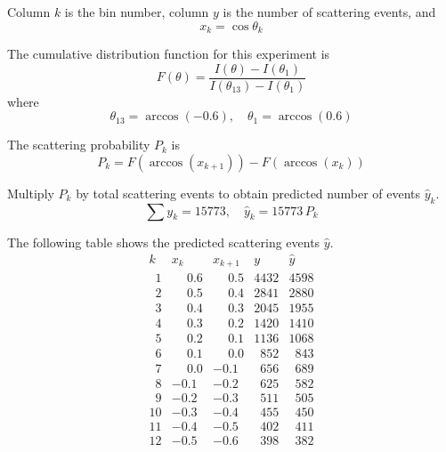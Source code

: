Column $k$ is the bin number, column $y$ is the number of scattering events, and
\begin{equation*}
x_k=\cos\theta_k
\end{equation*}

The cumulative distribution function for this experiment is
\begin{equation*}
F(\theta)=\frac{I(\theta)-I(\theta_1)}
{I(\theta_{13})-I(\theta_1)}
\end{equation*}
where
\begin{equation*}
\theta_{13}=\arccos(-0.6),
\quad
\theta_1=\arccos(0.6)
\end{equation*}

The scattering probability $P_k$ is
\begin{equation*}
P_k=F\left(\arccos(x_{k+1})\right)-F\left(\arccos(x_k)\right)
\end{equation*}

Multiply $P_k$ by total scattering events to obtain predicted number of events $\hat{y}_k$.
\begin{equation*}
\sum y_k=15773,\quad \hat{y}_k=15773\,P_k
\end{equation*}

The following table shows the predicted scattering events $\hat y$.
\begin{equation*}
\begin{matrix}
k & x_k & x_{k+1} & y & \hat y\\
\phantom01 & \phantom+0.6 & \phantom+0.5 & 4432 & 4598\\
\phantom02 & \phantom+0.5 & \phantom+0.4 & 2841 & 2880\\
\phantom03 & \phantom+0.4 & \phantom+0.3 & 2045 & 1955\\
\phantom04 & \phantom+0.3 & \phantom+0.2 & 1420 & 1410\\
\phantom05 & \phantom+0.2 & \phantom+0.1 & 1136 & 1068\\
\phantom06 & \phantom+0.1 & \phantom+0.0 & \phantom0852 & \phantom0843\\
\phantom07 & \phantom+0.0 & -0.1 & \phantom0656 & \phantom0689\\
\phantom08 & -0.1 & -0.2 & \phantom0625 & \phantom0582\\
\phantom09 & -0.2 & -0.3 & \phantom0511 & \phantom0505\\
10 & -0.3 & -0.4 & \phantom0455 & \phantom0450\\
11 & -0.4 & -0.5 & \phantom0402 & \phantom0411\\
12 & -0.5 & -0.6 & \phantom0398 & \phantom0382
\end{matrix}
\end{equation*}

